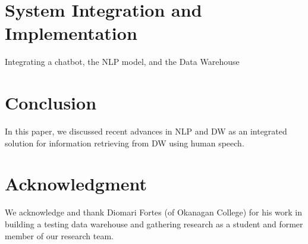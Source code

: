 \documentclass[conference]{IEEEtran}
\begin{document}
\section{ System Integration and Implementation }

Integrating a chatbot, the NLP model, and the Data Warehouse

\section{Conclusion}
In this paper, we discussed recent advances in NLP and DW as an integrated solution for information retrieving from DW using human speech. 



\section*{Acknowledgment}
We acknowledge and thank Diomari Fortes (of Okanagan College) for his work in building a testing data warehouse and gathering research as a student and former member of our research team.



\balance


\end{document}
